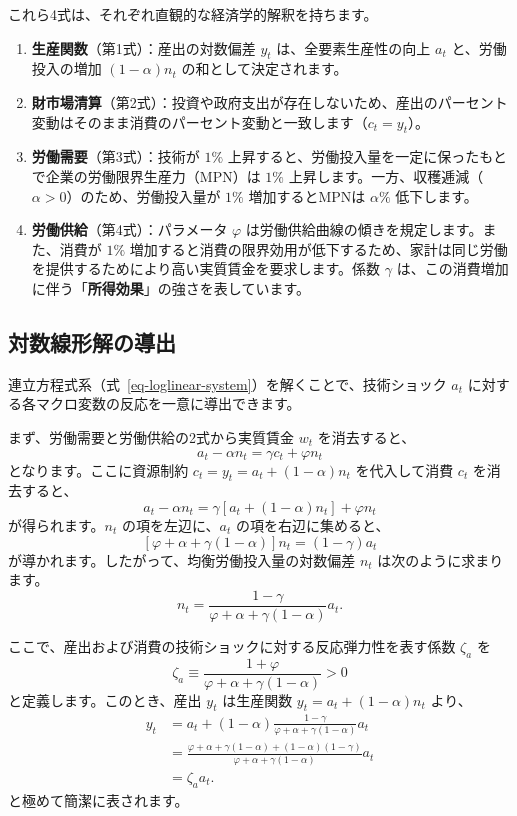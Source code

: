 \documentclass[
  japanese,
  lualatex,
  ja=standard,
  12pt,
  a4paper]{ltjsarticle}
\providecommand{\tightlist}{%
  \setlength{\itemsep}{0pt}\setlength{\parskip}{0pt}}
\begin{document}
これら4式は、それぞれ直観的な経済学的解釈を持ちます。

\begin{enumerate}
\def\labelenumi{\arabic{enumi}.}
\tightlist
\item
  \textbf{生産関数}（第1式）：産出の対数偏差 \(y_t\)
  は、全要素生産性の向上 \(a_t\) と、労働投入の増加 \((1-\alpha)n_t\)
  の和として決定されます。
\item
  \textbf{財市場清算}（第2式）：投資や政府支出が存在しないため、産出のパーセント変動はそのまま消費のパーセント変動と一致します（\(c_t = y_t\)）。
\item
  \textbf{労働需要}（第3式）：技術が \(1\%\)
  上昇すると、労働投入量を一定に保ったもとで企業の労働限界生産力（MPN）は
  \(1\%\)
  上昇します。一方、収穫逓減（\(\alpha > 0\)）のため、労働投入量が
  \(1\%\) 増加するとMPNは \(\alpha\%\) 低下します。
\item
  \textbf{労働供給}（第4式）：パラメータ \(\varphi\)
  は労働供給曲線の傾きを規定します。また、消費が \(1\%\)
  増加すると消費の限界効用が低下するため、家計は同じ労働を提供するためにより高い実質賃金を要求します。係数
  \(\gamma\)
  は、この消費増加に伴う「\textbf{所得効果}」の強さを表しています。
\end{enumerate}

\subsection{対数線形解の導出}\label{ux5bfeux6570ux7ddaux5f62ux89e3ux306eux5c0eux51fa}

連立方程式系（式~\ref{eq-loglinear-system}）を解くことで、技術ショック
\(a_t\) に対する各マクロ変数の反応を一意に導出できます。

まず、労働需要と労働供給の2式から実質賃金 \(w_t\) を消去すると、 \[
a_t - \alpha n_t = \gamma c_t + \varphi n_t
\] となります。ここに資源制約 \(c_t = y_t = a_t + (1-\alpha)n_t\)
を代入して消費 \(c_t\) を消去すると、 \[
a_t - \alpha n_t = \gamma \left[ a_t + (1-\alpha)n_t \right] + \varphi n_t
\] が得られます。\(n_t\) の項を左辺に、\(a_t\) の項を右辺に集めると、 \[
\left[ \varphi + \alpha + \gamma(1-\alpha) \right] n_t = (1-\gamma) a_t
\] が導かれます。したがって、均衡労働投入量の対数偏差 \(n_t\)
は次のように求まります。 \[
n_t = \frac{1-\gamma}{\varphi + \alpha + \gamma(1-\alpha)} a_t.
\]

ここで、産出および消費の技術ショックに対する反応弾力性を表す係数
\(\zeta_a\) を \[
\zeta_a \equiv \frac{1+\varphi}{\varphi + \alpha + \gamma(1-\alpha)} > 0
\] と定義します。このとき、産出 \(y_t\) は生産関数
\(y_t = a_t + (1-\alpha)n_t\) より、 \[
\begin{aligned}
y_t
&= a_t + (1-\alpha) \frac{1-\gamma}{\varphi + \alpha + \gamma(1-\alpha)} a_t \\
&= \frac{\varphi + \alpha + \gamma(1-\alpha) + (1-\alpha)(1-\gamma)}{\varphi + \alpha + \gamma(1-\alpha)} a_t \\
&= \zeta_a a_t.
\end{aligned}
\] と極めて簡潔に表されます。
\end{document}
